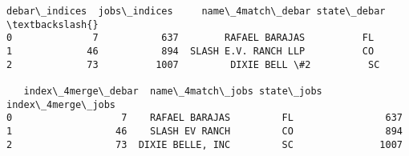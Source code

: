 \documentclass[11pt]{article}
\makeatletter
\newcommand{\boxspacing}{\kern\kvtcb@left@rule\kern\kvtcb@boxsep}
\newcommand{\prompt}[4]{
        {\ttfamily\llap{{\color{#2}[#3]:\hspace{3pt}#4}}\vspace{-\baselineskip}}
    }
\makeatother
\begin{document}
            \begin{tcolorbox}[breakable, size=fbox, boxrule=.5pt, pad at break*=1mm, opacityfill=0]
\prompt{Out}{outcolor}{182}{\boxspacing}
\begin{Verbatim}[commandchars=\\\{\}]
   debar\_indices  jobs\_indices     name\_4match\_debar state\_debar  \textbackslash{}
0              7           637        RAFAEL BARAJAS          FL
1             46           894  SLASH E.V. RANCH LLP          CO
2             73          1007         DIXIE BELL \#2          SC

   index\_4merge\_debar  name\_4match\_jobs state\_jobs  index\_4merge\_jobs
0                   7    RAFAEL BARAJAS         FL                637
1                  46    SLASH EV RANCH         CO                894
2                  73  DIXIE BELLE, INC         SC               1007
\end{Verbatim}
\end{tcolorbox}
        
    \begin{tcolorbox}[breakable, size=fbox, boxrule=1pt, pad at break*=1mm,colback=cellbackground, colframe=cellborder]
\prompt{In}{incolor}{ }{\boxspacing}
\begin{Verbatim}[commandchars=\\\{\}]

\end{Verbatim}
\end{tcolorbox}


    
    
    
\end{document}
